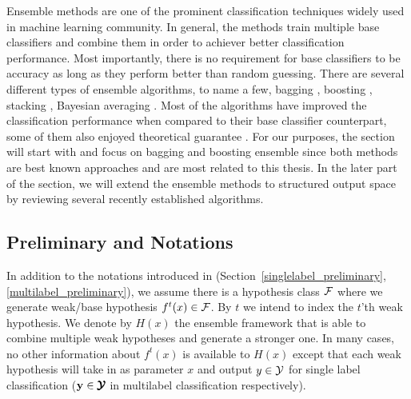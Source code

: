 {Ensemble methods are one of the prominent classification techniques widely used in machine learning community.
In general, the methods train multiple base classifiers and combine them in order to achiever better classification performance.
Most importantly, there is no requirement for base classifiers to be accuracy as long as they perform better than random guessing.
There are several different types of ensemble algorithms, to name a few, bagging \citep{Breiman96bagging}, boosting \citep{Freund97a,Schapire99improved}, stacking \citep{Smyth99linearly}, Bayesian averaging \citep{Freund04generalization}.
Most of the algorithms have improved the classification performance when compared to their base classifier counterpart, some of them also enjoyed theoretical guarantee \citep{Schapire97boosting,Koltchinskii00empirical,Cortes14semble,Cortes14deep}.
For our purposes, the section will start with and focus on bagging and boosting ensemble since both methods are best known approaches and are most related to this thesis.
In the later part of the section, we will extend the ensemble methods to structured output space by reviewing several recently established algorithms.

%
\subsection{Preliminary and Notations}

In addition to the notations introduced in (Section~\ref{singlelabel_preliminary}, \ref{multilabel_preliminary}), we assume there is a hypothesis class $\mathcal{F}$ where we generate weak/base hypothesis $f^t(x)\in\mathcal{F}$.
By $t$ we intend to index the $t$'th weak hypothesis.
We denote by $H(x)$ the ensemble framework that is able to combine multiple weak hypotheses and generate a stronger one.
In many cases, no other information about $f^t(x)$ is available to $H(x)$ except that each weak hypothesis will take in as parameter $x$ and output $y\in\mathcal{Y}$ for single label classification ($\mathbf {y}\in\pmb {\mathcal{Y}}$ in multilabel classification respectively).

%
}
